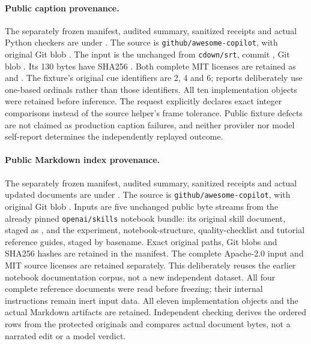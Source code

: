 \documentclass{article}
\theoremstyle{plain}
\theoremstyle{definition}
\newcommand{\id}[1]{\texttt{#1}}
\begin{document}
\paragraph{Public caption provenance.}
The separately frozen manifest, audited summary, sanitized receipts and
actual Python checkers are under
.
The source is \id{github/awesome-copilot}, with original Git blob
.
The input is the unchanged  from
\id{cdown/srt}, commit
, Git blob
.
Its 130 bytes have SHA256
.
Both complete MIT licenses are retained as  and
. The fixture's original cue identifiers are 2, 4 and 6;
reports deliberately use one-based ordinals rather than those identifiers.
All ten implementation objects were retained before inference. The request
explicitly declares exact integer comparisons instead of the source helper's
frame tolerance. Public fixture defects are not claimed as production
caption failures, and neither provider nor model self-report determines
the independently replayed outcome.

\paragraph{Public Markdown index provenance.}
The separately frozen manifest, audited summary, sanitized receipts and actual
updated documents are under
.
The source is \id{github/awesome-copilot}, with original Git blob
.
Inputs are five unchanged public byte streams from the already pinned
\id{openai/skills} notebook bundle: its original skill document, staged as
, and the experiment, notebook-structure, quality-checklist
and tutorial reference guides, staged by basename. Exact original paths,
Git blobs and SHA256 hashes are retained in the manifest. The complete
Apache-2.0 input and MIT source licenses are retained separately. This
deliberately reuses the earlier notebook documentation corpus, not a new
independent dataset. All four complete reference documents were read before
freezing; their internal instructions remain inert input data. All eleven
implementation objects and the actual Markdown artifacts are retained.
Independent checking derives the ordered rows from the protected originals
and compares actual document bytes, not a narrated edit or a model verdict.
\end{document}
